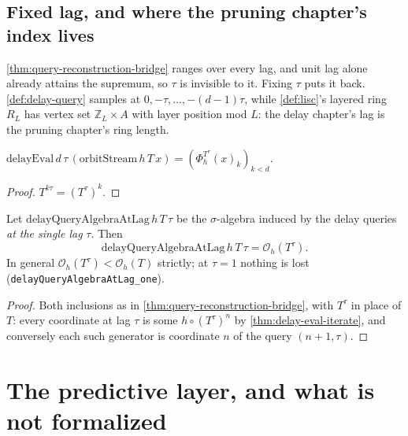 \subsection{Fixed lag, and where the pruning chapter's index lives}

\ref{thm:query-reconstruction-bridge} ranges over every lag, and unit lag alone
already attains the supremum, so $\tau$ is invisible to it. Fixing $\tau$ puts
it back. \ref{def:delay-query} samples at $0, -\tau, \dots, -(d-1)\tau$, while
\ref{def:lisc}'s layered ring $R_L$ has vertex set $\mathbb{Z}_L \times A$ with
layer position mod $L$: the delay chapter's lag is the pruning chapter's ring
length.

\begin{theorem}
  \label{thm:delay-eval-iterate}
  \leanok
  $\mathrm{delayEval}\,d\,\tau\,(\mathrm{orbitStream}\,h\,T\,x)
   = (\Phi_h^{T^{\tau}}(x)_k)_{k<d}$.
\end{theorem}

\begin{proof}
  \leanok
  $T^{k\tau} = (T^{\tau})^{k}$.
\end{proof}

\begin{theorem}
  \label{thm:lag-algebra}
  \leanok
  Let $\mathrm{delayQueryAlgebraAtLag}\,h\,T\,\tau$ be the $\sigma$-algebra
  induced by the delay queries \emph{at the single lag} $\tau$. Then
  \[ \mathrm{delayQueryAlgebraAtLag}\,h\,T\,\tau = \mathcal{O}_h(T^{\tau}). \]
  In general $\mathcal{O}_h(T^{\tau}) < \mathcal{O}_h(T)$ strictly; at
  $\tau = 1$ nothing is lost (\texttt{delayQueryAlgebraAtLag\_one}).
\end{theorem}

\begin{proof}
  \leanok
  Both inclusions as in \ref{thm:query-reconstruction-bridge}, with $T^{\tau}$
  in place of $T$: every coordinate at lag $\tau$ is some $h \circ (T^{\tau})^n$
  by \ref{thm:delay-eval-iterate}, and conversely each such generator is
  coordinate $n$ of the query $(n+1, \tau)$.
\end{proof}

\section{The predictive layer, and what is not formalized}
\label{sec:delay-gaps}


